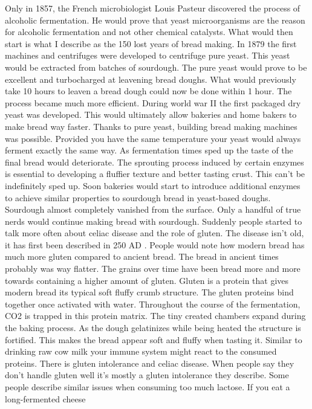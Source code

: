 Only in 1857, the French microbiologist Louis Pasteur discovered
the process of alcoholic fermentation. He would prove that
yeast microorganisms are the reason for alcoholic fermentation
and not other chemical catalysts. What would then start is
what I describe as the 150 lost years of bread making. In 1879
the first machines and centrifuges were developed to centrifuge
pure yeast. This yeast would be extracted from batches of sourdough.
The pure yeast would prove to be excellent and turbocharged
at leavening bread doughs. What would previously take 10 hours
to leaven a bread dough could now be done within 1 hour.
The process became much more efficient. During world war II
the first packaged dry yeast was developed. This would ultimately
allow bakeries and home bakers to make bread way faster.
Thanks to pure yeast, building bread making machines was
possible. Provided you have the same temperature your yeast
would always ferment exactly the same way. As fermentation
times sped up the taste of the final bread would deteriorate.
The sprouting process induced by certain enzymes is essential
to developing a fluffier texture and better tasting crust. This
can't be indefinitely sped up. Soon bakeries would start
to introduce additional enzymes to achieve similar properties
to sourdough bread in yeast-based doughs. Sourdough almost
completely vanished from the surface. Only a handful
of true nerds would continue making bread with sourdough.
Suddenly people started to talk more often about celiac disease
and the role of gluten. The disease isn't old, it has first
been described in 250 AD \cite{coeliac+disease}. People
would note how modern bread has much more gluten compared
to ancient bread. The bread in ancient times probably was way flatter.
The grains over time have been bread more and more towards containing a higher
amount of gluten. Gluten is a protein that gives modern
bread its typical soft fluffy crumb structure. The
gluten proteins bind together once activated with water.
Throughout the course of the fermentation, CO2 is trapped
in this protein matrix. The tiny created chambers expand
during the baking process. As the dough gelatinizes while
being heated the structure is fortified. This makes the bread appear
soft and fluffy when tasting it. Similar to drinking
raw cow milk your immune system might react to
the consumed proteins. There is gluten intolerance
and celiac disease. When people say they don't handle
gluten well it's mostly a gluten intolerance they describe.
Some people describe similar issues when consuming
too much lactose. If you eat a long-fermented cheese
